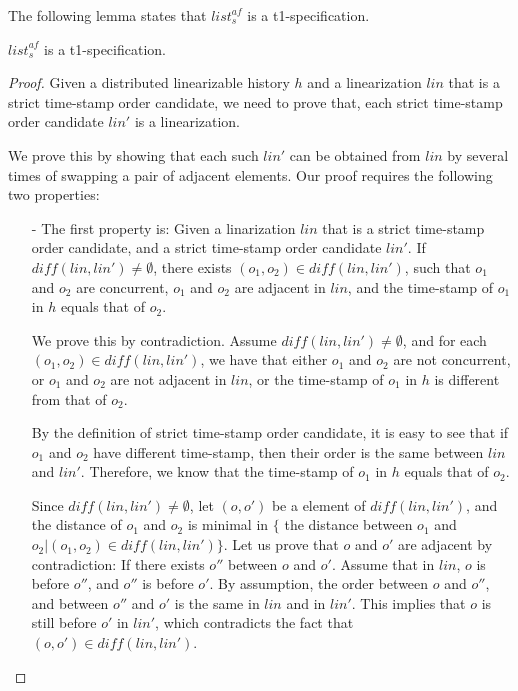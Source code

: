 {The following lemma states that $\mathit{list}_s^{\mathit{af}}$ is a t1-specification.

\begin{lemma}
\label{lemma:list-af is a t1-specification}
$\mathit{list}_s^{\mathit{af}}$ is a t1-specification.
\end{lemma}

\begin {proof}

Given a distributed linearizable history $h$ and a linearization $\mathit{lin}$ that is a strict time-stamp order candidate, we need to prove that, each strict time-stamp order candidate $\mathit{lin}'$ is a linearization.

We prove this by showing that each such $\mathit{lin}'$ can be obtained from $\mathit{lin}$ by several times of swapping a pair of adjacent elements. Our proof requires the following two properties:

\begin{itemize}
\setlength{\itemsep}{0.5pt}
\item[-] The first property is: Given a linarization $\mathit{lin}$ that is a strict time-stamp order candidate, and a strict time-stamp order candidate $\mathit{lin}'$. If $\mathit{diff}(\mathit{lin},\mathit{lin}') \neq \emptyset$, there exists $(o_1,o_2) \in \mathit{diff}(\mathit{lin},\mathit{lin}')$, such that $o_1$ and $o_2$ are concurrent, $o_1$ and $o_2$ are adjacent in $\mathit{lin}$, and the time-stamp of $o_1$ in $h$ equals that of $o_2$.

    We prove this by contradiction. Assume $\mathit{diff}(\mathit{lin},\mathit{lin}') \neq \emptyset$, and for each $(o_1,o_2) \in \mathit{diff}(\mathit{lin},\mathit{lin}')$, we have that either $o_1$ and $o_2$ are not concurrent, or $o_1$ and $o_2$ are not adjacent in $\mathit{lin}$, or the time-stamp of $o_1$ in $h$ is different from that of $o_2$.

    By the definition of strict time-stamp order candidate, it is easy to see that if $o_1$ and $o_2$ have different time-stamp, then their order is the same between $\mathit{lin}$ and $\mathit{lin}'$. Therefore, we know that the time-stamp of $o_1$ in $h$ equals that of $o_2$.

    Since $\mathit{diff}(\mathit{lin},\mathit{lin}') \neq \emptyset$, let $(o,o')$ be a element of $\mathit{diff}(\mathit{lin},\mathit{lin}')$, and the distance of $o_1$ and $o_2$ is minimal in $\{$ the distance between $o_1$ and $o_2 \vert (o_1,o_2) \in \mathit{diff}(\mathit{lin},\mathit{lin}') \}$. Let us prove that $o$ and $o'$ are adjacent by contradiction: If there exists $o''$ between $o$ and $o'$. Assume that in $\mathit{lin}$, $o$ is before $o''$, and $o''$ is before $o'$. By assumption, the order between $o$ and $o''$, and between $o''$ and $o'$ is the same in $\mathit{lin}$ and in $\mathit{lin}'$. This implies that $o$ is still before $o'$ in $\mathit{lin}'$, which contradicts the fact that $(o,o') \in \mathit{diff}(\mathit{lin},\mathit{lin}')$.


\end{itemize}
\end{proof}}
